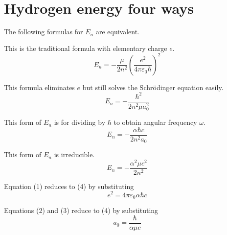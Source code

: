 

\section*{Hydrogen energy four ways}

The following formulas for $E_n$ are equivalent.

\bigskip
This is the traditional formula with elementary charge $e$.
\begin{equation*}
E_n=-\frac{\mu}{2n^2}\left(\frac{e^2}{4\pi\varepsilon_0\hbar}\right)^2
\tag{1}
\end{equation*}

This formula eliminates $e$ but still solves the Schr\"odinger equation easily.
\begin{equation*}
E_n=-\frac{\hbar^2}{2n^2\mu a_0^2}
\tag{2}
\end{equation*}

This form of $E_n$ is for dividing by $\hbar$ to obtain angular frequency $\omega$.
\begin{equation*}
E_n=-\frac{\alpha\hbar c}{2n^2a_0}
\tag{3}
\end{equation*}

This form of $E_n$ is irreducible.
\begin{equation*}
E_n=-\frac{\alpha^2\mu c^2}{2n^2}
\tag{4}
\end{equation*}

Equation (1) reduces to (4) by substituting
\begin{equation*}
e^2=4\pi\varepsilon_0\alpha\hbar c
\end{equation*}

Equations (2) and (3) reduce to (4) by substituting
\begin{equation*}
a_0=\frac{\hbar}{\alpha\mu c}
\end{equation*}


